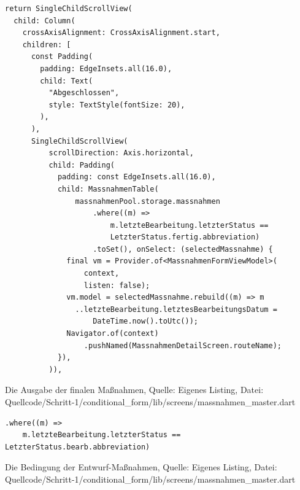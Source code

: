     \begin{listing}[htbp]
        \begin{verbatim}
return SingleChildScrollView(
  child: Column(
    crossAxisAlignment: CrossAxisAlignment.start,
    children: [
      const Padding(
        padding: EdgeInsets.all(16.0),
        child: Text(
          "Abgeschlossen",
          style: TextStyle(fontSize: 20),
        ),
      ),
      SingleChildScrollView(
          scrollDirection: Axis.horizontal,
          child: Padding(
            padding: const EdgeInsets.all(16.0),
            child: MassnahmenTable(
                massnahmenPool.storage.massnahmen
                    .where((m) =>
                        m.letzteBearbeitung.letzterStatus ==
                        LetzterStatus.fertig.abbreviation)
                    .toSet(), onSelect: (selectedMassnahme) {
              final vm = Provider.of<MassnahmenFormViewModel>(
                  context,
                  listen: false);
              vm.model = selectedMassnahme.rebuild((m) => m
                ..letzteBearbeitung.letztesBearbeitungsDatum =
                    DateTime.now().toUtc());
              Navigator.of(context)
                  .pushNamed(MassnahmenDetailScreen.routeName);
            }),
          )),
        \end{verbatim}
\caption[Schritt 1 Ausgabe der finalen Maßnahmen]{Die Ausgabe der finalen Maßnahmen, Quelle: Eigenes Listing, \newline Datei: Quellcode/Schritt-1/conditional_form/lib/screens/massnahmen_master.dart}

\label{lst:Schritt1AusgabeDerFinalenMaßnahmen}
\end{listing}


\begin{listing}[htbp]
    \begin{verbatim}
.where((m) =>
    m.letzteBearbeitung.letzterStatus == LetzterStatus.bearb.abbreviation)
\end{verbatim}
\caption[Schritt 1 Bedingung der Entwurf-Maßnahmen]{Die Bedingung der Entwurf-Maßnahmen, Quelle: Eigenes Listing, \newline Datei: Quellcode/Schritt-1/conditional_form/lib/screens/massnahmen_master.dart}
\label{lst:Schritt1BedingungDerEntwurfMaßnahmen}
\end{listing}



